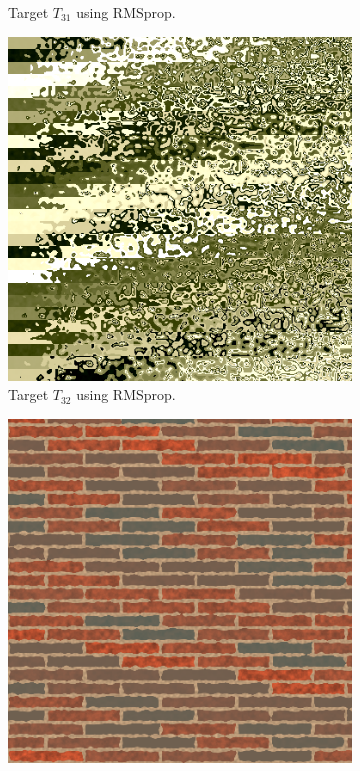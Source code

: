 \begin{figure}
\begin{subfigure}[t]{.25\textwidth}
    \caption{Target $T_{31}$ using RMSprop.}
    \label{fig:M3NeuralFinalRendersTwoParamRMSprop}
\end{subfigure}\hspace{0.7cm}
\begin{subfigure}[t]{.25\textwidth}
    \centering
    \includegraphics[width=\linewidth]{img/evaluation/M3/random/Neural_RMSprop_random_final.png}
    \caption{Target $T_{32}$ using RMSprop.}
    \label{fig:M3NeuralFinalRendersRandomRMSprop}
\end{subfigure}\hspace{0.7cm}
\begin{subfigure}[t]{.25\textwidth}
    \centering
    \includegraphics[width=\linewidth]{img/evaluation/M3/real life/Neural_RMSprop_real_life_final.png}

\end{subfigure}
\end{figure}
